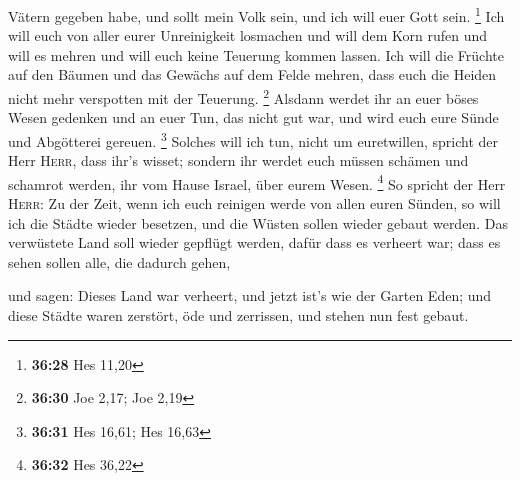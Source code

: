 Vätern gegeben habe, und sollt mein Volk sein, und ich will euer Gott
sein. \footnote{\textbf{36:28} Hes 11,20}  Ich will euch
von aller eurer Unreinigkeit losmachen und will dem Korn rufen und will
es mehren und will euch keine Teuerung kommen lassen. 
Ich will die Früchte auf den Bäumen und das Gewächs auf dem Felde
mehren, dass euch die Heiden nicht mehr verspotten mit der Teuerung.
\footnote{\textbf{36:30} Joe 2,17; Joe 2,19}  Alsdann
werdet ihr an euer böses Wesen gedenken und an euer Tun, das nicht gut
war, und wird euch eure Sünde und Abgötterei gereuen. \footnote{\textbf{36:31}
  Hes 16,61; Hes 16,63}  Solches will ich tun, nicht um
euretwillen, spricht der Herr \textsc{Herr}, dass ihr's wisset; sondern
ihr werdet euch müssen schämen und schamrot werden, ihr vom Hause
Israel, über eurem Wesen. \footnote{\textbf{36:32} Hes 36,22}
 So spricht der Herr \textsc{Herr}: Zu der Zeit, wenn ich
euch reinigen werde von allen euren Sünden, so will ich die Städte
wieder besetzen, und die Wüsten sollen wieder gebaut werden.
 Das verwüstete Land soll wieder gepflügt werden, dafür
dass es verheert war; dass es sehen sollen alle, die dadurch gehen,

 und sagen: Dieses Land war verheert, und jetzt ist's wie
der Garten Eden; und diese Städte waren zerstört, öde und zerrissen, und
stehen nun fest gebaut.

